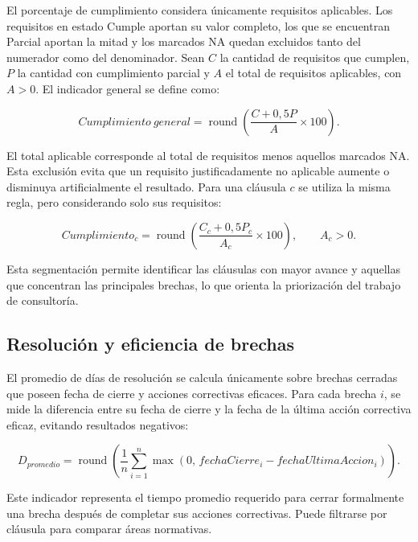 \documentclass[final]{udpthesis}
\begin{document}
El porcentaje de cumplimiento considera únicamente requisitos aplicables. Los requisitos en estado Cumple aportan su valor completo, los que se encuentran Parcial aportan la mitad y los marcados NA quedan excluidos tanto del numerador como del denominador. Sean $C$ la cantidad de requisitos que cumplen, $P$ la cantidad con cumplimiento parcial y $A$ el total de requisitos aplicables, con $A>0$. El indicador general se define como:

\begin{equation}
Cumplimiento\ general =
\operatorname{round}\left(\frac{C + 0{,}5P}{A}\times 100\right).
\label{eq:cumplimiento-general}
\end{equation}

El total aplicable corresponde al total de requisitos menos aquellos marcados NA. Esta exclusión evita que un requisito justificadamente no aplicable aumente o disminuya artificialmente el resultado. Para una cláusula $c$ se utiliza la misma regla, pero considerando solo sus requisitos:

\begin{equation}
Cumplimiento_c =
\operatorname{round}\left(\frac{C_c + 0{,}5P_c}{A_c}\times 100\right),
\qquad A_c>0.
\label{eq:cumplimiento-clausula}
\end{equation}

Esta segmentación permite identificar las cláusulas con mayor avance y aquellas que concentran las principales brechas, lo que orienta la priorización del trabajo de consultoría.

\subsection{Resolución y eficiencia de brechas}

El promedio de días de resolución se calcula únicamente sobre brechas cerradas que poseen fecha de cierre y acciones correctivas eficaces. Para cada brecha $i$, se mide la diferencia entre su fecha de cierre y la fecha de la última acción correctiva eficaz, evitando resultados negativos:

\begin{equation}
D_{promedio} =
\operatorname{round}\left(\frac{1}{n}\sum_{i=1}^{n}
\max\left(0,\, fechaCierre_i-fechaUltimaAccion_i\right)\right).
\label{eq:promedio-resolucion}
\end{equation}

Este indicador representa el tiempo promedio requerido para cerrar formalmente una brecha después de completar sus acciones correctivas. Puede filtrarse por cláusula para comparar áreas normativas.
\end{document}
